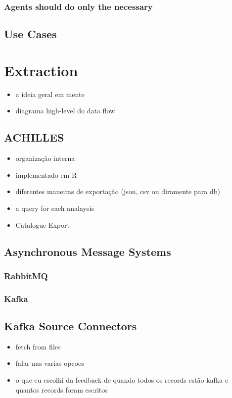 \subsubsection*{Agents should do only the necessary}

\subsection{Use Cases}

\section{Extraction}

\begin{itemize}
    \item a ideia geral em mente
    \item diagrama high-level do data flow
\end{itemize}

\subsection{ACHILLES}
\begin{itemize}
    \item organização interna
    \item implementado em R
    \item diferentes maneiras de exportação (json, csv ou diramente para db)
    \item a query for each analaysis
    \item Catalogue Export
\end{itemize}

\subsection{Asynchronous Message Systems}

\subsubsection{RabbitMQ}

\subsubsection{Kafka}


\subsection{Kafka Source Connectors}
\begin{itemize}
    \item fetch from files
    \item falar nas varias opcoes
    \item o que eu escolhi da feedback de quando todos os records estão kafka e quantos records foram escritos
\end{itemize}


